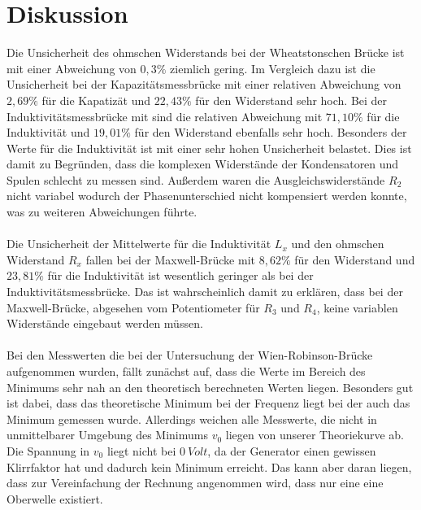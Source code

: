 \section{Diskussion}
\label{sec:Diskussion}
Die Unsicherheit des ohmschen Widerstands bei der Wheatstonschen Brücke ist mit einer Abweichung von $0,3\%$ ziemlich gering.
Im Vergleich dazu ist die Unsicherheit bei der Kapazitätsmessbrücke mit einer relativen Abweichung von $2,69\%$ für die Kapatizät und $22,43\%$ für den Widerstand sehr hoch.
Bei der Induktivitätsmessbrücke mit sind die relativen Abweichung mit $71,10\%$ für die Induktivität und $19,01\%$ für den Widerstand ebenfalls sehr hoch.
Besonders der Werte für die Induktivität ist mit einer sehr hohen Unsicherheit belastet.
Dies ist damit zu Begründen, dass die komplexen Widerstände der Kondensatoren und Spulen schlecht zu messen sind.
Außerdem waren die Ausgleichswiderstände $R_2$ nicht variabel wodurch der Phasenunterschied nicht kompensiert werden konnte, was zu weiteren Abweichungen führte.
\\\\
Die Unsicherheit der Mittelwerte für die Induktivität $L_x$ und den ohmschen Widerstand $R_x$ fallen bei der Maxwell-Brücke mit $8,62\%$ für den Widerstand und $23,81\%$ für die Induktivität ist wesentlich geringer als bei der Induktivitätsmessbrücke.
Das ist wahrscheinlich damit zu erklären, dass bei der Maxwell-Brücke, abgesehen vom Potentiometer für $R_3$ und $R_4$, keine variablen Widerstände eingebaut werden müssen.
\\\\
Bei den Messwerten die bei der Untersuchung der Wien-Robinson-Brücke aufgenommen wurden, fällt zunächst auf, dass die Werte im Bereich des Minimums sehr nah an den theoretisch berechneten Werten liegen.
Besonders gut ist dabei, dass das theoretische Minimum bei der Frequenz liegt bei der auch das Minimum gemessen wurde.
Allerdings weichen alle Messwerte, die nicht in unmittelbarer Umgebung des Minimums $v_0$ liegen von unserer Theoriekurve ab.
Die Spannung in $v_0$ liegt nicht bei $\SI{0}{Volt}$, da der Generator einen gewissen Klirrfaktor hat und dadurch kein Minimum erreicht.
Das kann aber daran liegen, dass zur Vereinfachung der Rechnung angenommen wird, dass nur eine eine Oberwelle existiert.